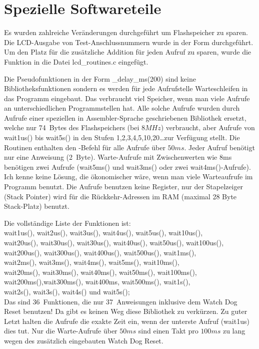 
\chapter{Spezielle Softwareteile}

Es wurden zahlreiche Veränderungen durchgeführt um Flashspeicher zu sparen.
Die LCD-Ausgabe von Test-Anschlussnummern wurde in der Form  durchgeführt.
Um den Platz für die zusätzliche Addition für jeden Aufruf zu sparen, wurde die
Funktion  in die Datei lcd\_routines.c eingefügt.


Die Pseudofunktionen in der Form \_delay\_ms(200) sind keine Bibliotheksfunktionen
sondern es werden für jede Aufrufstelle Warteschleifen in das Programm eingebaut.
Das verbraucht viel Speicher, wenn man viele Aufrufe an unterschiedlichen Programmstellen hat.
Alle solche Aufrufe wurden durch Aufrufe einer speziellen in Assembler-Sprache geschriebenen
Bibliothek ersetzt, welche nur 74~Bytes des Flashspeichers (bei \(8MHz\)) verbraucht, aber
Aufrufe von wait1us() bis wait5s() in den Stufen 1,2,3,4,5,10,20\dots zur Verfügung stellt.
Die Routinen enthalten den -Befehl für alle Aufrufe über \(50ms\).
Jeder Aufruf benötigt nur eine Anweisung (2~Byte). Warte-Aufrufe mit Zwischenwerten
wie 8ms benötigen zwei Aufrufe (wait5ms() und wait3ms() oder zwei wait4ms()-Aufrufe).
Ich kenne keine Lösung, die ökonomischer wäre, wenn man viele Warteaufrufe im Programm benutzt.
Die Aufrufe benutzen keine Register, nur der Stapelzeiger (Stack Pointer) wird für die Rückkehr-Adressen
im RAM (maximal 28 Byte Stack-Platz) benutzt.

Die vollständige Liste der Funktionen ist:\\
wait1us(), wait2us(), wait3us(), wait4us(), wait5us(), wait10us(), \\
wait20us(), wait30us(), wait30us(), wait40us(), wait50us(), wait100us(), \\
wait200us(), wait300us(), wait400us(), wait500us(), wait1ms(),\\
wait2ms(), wait3ms(), wait4ms(), wait5ms(), wait10ms(),\\
wait20ms(), wait30ms(), wait40ms(), wait50ms(), wait100ms(),\\
wait200ms(),wait300ms(), wait400ms, wait500ms(), wait1s(),\\
wait2s(), wait3s(), wait4s() und wait5s();\\
Das sind 36~Funktionen, die nur 37~Anweisungen inklusive dem Watch Dog Reset benutzen!
Da gibt es keinen Weg diese Bibliothek zu verkürzen.
Zu guter Letzt halten die Aufrufe die exakte Zeit ein, wenn der unterste Aufruf (wait1us) dies tut.
Nur die Warte-Aufrufe über \(50ms\) sind einen Takt pro \(100ms\) zu lang wegen des zusätzlich eingebauten
Watch Dog Reset.


